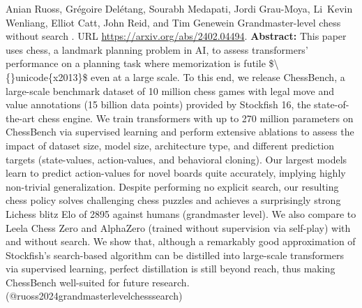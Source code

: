 \documentclass{article} %
\begin{document}
\begin{thebibliography}{}
 Anian Ruoss, Grégoire Delétang, Sourabh Medapati, Jordi Grau-Moya, Li~Kevin Wenliang, Elliot Catt, John Reid, and Tim Genewein \newblock Grandmaster-level chess without search . \newblock URL \url{https://arxiv.org/abs/2402.04494}. \newblock \textbf{Abstract:} This paper uses chess, a landmark planning problem in AI, to assess transformers' performance on a planning task where memorization is futile \$\textbackslash\{\}unicode\{x2013\}\$ even at a large scale. To this end, we release ChessBench, a large-scale benchmark dataset of 10 million chess games with legal move and value annotations (15 billion data points) provided by Stockfish 16, the state-of-the-art chess engine. We train transformers with up to 270 million parameters on ChessBench via supervised learning and perform extensive ablations to assess the impact of dataset size, model size, architecture type, and different prediction targets (state-values, action-values, and behavioral cloning). Our largest models learn to predict action-values for novel boards quite accurately, implying highly non-trivial generalization. Despite performing no explicit search, our resulting chess policy solves challenging chess puzzles and achieves a surprisingly strong Lichess blitz Elo of 2895 against humans (grandmaster level). We also compare to Leela Chess Zero and AlphaZero (trained without supervision via self-play) with and without search. We show that, although a remarkably good approximation of Stockfish's search-based algorithm can be distilled into large-scale transformers via supervised learning, perfect distillation is still beyond reach, thus making ChessBench well-suited for future research. \newblock (@ruoss2024grandmasterlevelchesssearch)


\end{thebibliography}
\end{document}
